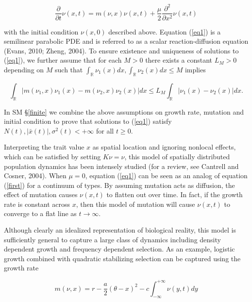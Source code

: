 \documentclass[]{elsarticle} %
\begin{document}
\begin{equation}\label{eq1}
\frac{\partial}{\partial t}\nu(x,t)=m(\nu,x)\nu(x,t)+\frac{\mu}{2}\frac{\partial^2}{\partial x^2}\nu(x,t)
\end{equation}

with the initial condition \(\nu(x,0)\) described above. Equation
(\ref{eq1}) is a semilinear parabolic PDE and is referred to as a scalar
reaction-diffusion equation (Evans, 2010; Zheng, 2004). To ensure
existence and uniqueness of solutions to (\ref{eq1}), we further assume
that for each \(M>0\) there exists a constant \(L_M>0\) depending on
\(M\) such that
\(\int_\mathbb{R}\nu_1(x)dx,\int_\mathbb{R}\nu_2(x)dx\leq M\) implies

\begin{equation}\label{local_lipschitz}
\int_\mathbb{R}\left|m(\nu_1,x)\nu_1(x)-m(\nu_2,x)\nu_2(x)\right|dx\leq L_M\int_\mathbb{R}|\nu_1(x)-\nu_2(x)|dx.
\end{equation}

In SM \S\ref{finite} we combine the above assumptions on growth rate,
mutation and initial condition to prove that solutions to (\ref{eq1})
satisfy \(N(t),|\bar x(t)|,\sigma^2(t)<+\infty\) for all \(t\geq0\).

Interpreting the trait value \(x\) as spatial location and ignoring
nonlocal effects, which can be satisfied by setting \(K\nu=\nu\), this
model of spatially distributed population dynamics has been intensely
studied (for a review, see Cantrell and Cosner, 2004). When \(\mu=0\),
equation (\ref{eq1}) can be seen as an analog of equation (\ref{first})
for a continuum of types. By assuming mutation acts as diffusion, the
effect of mutation causes \(\nu(x,t)\) to flatten out over time. In
fact, if the growth rate is constant across \(x\), then this model of
mutation will cause \(\nu(x,t)\) to converge to a flat line as
\(t\to\infty\).

Although clearly an idealized representation of biological reality, this
model is sufficiently general to capture a large class of dynamics
including density dependent growth and frequency dependent selection. As
an example, logistic growth combined with quadratic stabilizing
selection can be captured using the growth rate

\begin{equation}\label{special_m}
m(\nu,x)=r-\frac{a}{2}(\theta-x)^2-c\int_{-\infty}^{+\infty}\nu(y,t)dy
\end{equation}
\end{document}
